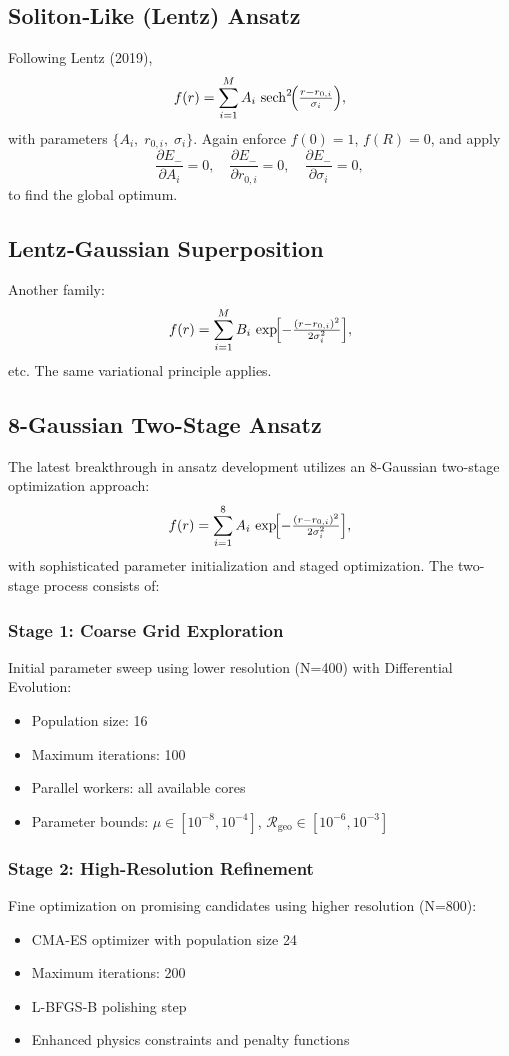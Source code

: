 \subsection{Soliton‐Like (Lentz) Ansatz}
Following Lentz (2019),
\[
  f(r) = \sum_{i=1}^M A_i \,\sech^2\!\Bigl(\tfrac{r - r_{0,i}}{\sigma_i}\Bigr),
\]
with parameters $\{A_i,\;r_{0,i},\;\sigma_i\}$.  Again enforce $f(0)=1$, $f(R)=0$, and apply
\[
  \frac{\partial E_{-}}{\partial A_i} = 0,\quad
  \frac{\partial E_{-}}{\partial r_{0,i}} = 0,\quad
  \frac{\partial E_{-}}{\partial \sigma_i} = 0,
\]
to find the global optimum.

\subsection{Lentz‐Gaussian Superposition}
Another family:
\[
  f(r) = \sum_{i=1}^M B_i\,\exp\!\Bigl[-\tfrac{(r - r_{0,i})^2}{2\sigma_i^2}\Bigr],
\]
etc.  The same variational principle applies.

\subsection{8-Gaussian Two-Stage Ansatz}
The latest breakthrough in ansatz development utilizes an 8-Gaussian two-stage optimization approach:
\[
  f(r) = \sum_{i=1}^8 A_i\,\exp\!\Bigl[-\tfrac{(r - r_{0,i})^2}{2\sigma_i^2}\Bigr],
\]
with sophisticated parameter initialization and staged optimization. The two-stage process consists of:

\subsubsection{Stage 1: Coarse Grid Exploration}
Initial parameter sweep using lower resolution (N=400) with Differential Evolution:
\begin{itemize}
\item Population size: 16
\item Maximum iterations: 100  
\item Parallel workers: all available cores
\item Parameter bounds: $\mu \in [10^{-8}, 10^{-4}]$, $\mathcal{R}_{\text{geo}} \in [10^{-6}, 10^{-3}]$
\end{itemize}

\subsubsection{Stage 2: High-Resolution Refinement}
Fine optimization on promising candidates using higher resolution (N=800):
\begin{itemize}
\item CMA-ES optimizer with population size 24
\item Maximum iterations: 200
\item L-BFGS-B polishing step
\item Enhanced physics constraints and penalty functions
\end{itemize}

